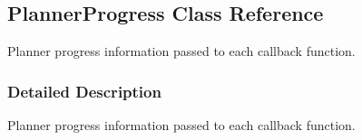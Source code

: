 \hypertarget{classOpenRAVE_1_1PlannerBase_1_1PlannerProgress}{
\subsection{PlannerProgress Class Reference}
\label{classOpenRAVE_1_1PlannerBase_1_1PlannerProgress}
}


Planner progress information passed to each callback function.  




\subsubsection{Detailed Description}
Planner progress information passed to each callback function. 